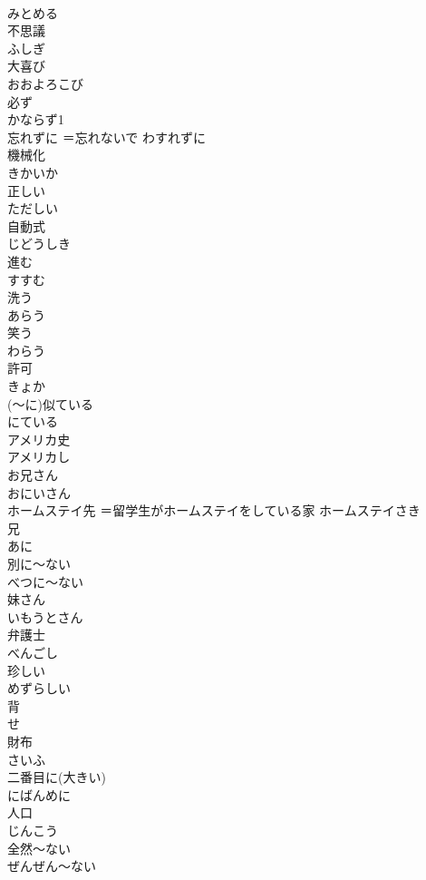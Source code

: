 \documentclass[8pt]{extreport}
\begin{document}
\begin{CJK}{UTF8}{min}
\\	みとめる
\\	不思議	
\\	ふしぎ
\\	大喜び	
\\	おおよろこび
\\	必ず	
\\	かならず1
\\	忘れずに	＝忘れないで	わすれずに
\\	機械化	
\\	きかいか
\\	正しい	
\\	ただしい
\\	自動式	
\\	じどうしき
\\	進む	
\\	すすむ
\\	洗う	
\\	あらう
\\	笑う	
\\	わらう
\\	許可	
\\	きょか
\\	(～に)似ている	
\\	にている
\\	アメリカ史	
\\	アメリカし
\\	お兄さん	
\\	おにいさん
\\	ホームステイ先	＝留学生がホームステイをしている家	ホームステイさき
\\	兄	
\\	あに
\\	別に～ない	
\\	べつに～ない
\\	妹さん	
\\	いもうとさん
\\	弁護士	
\\	べんごし
\\	珍しい	
\\	めずらしい
\\	背	
\\	せ
\\	財布	
\\	さいふ
\\	二番目に(大きい)	
\\	にばんめに
\\	人口	
\\	じんこう
\\	全然～ない	
\\	ぜんぜん～ない

\end{CJK}
\end{document}

